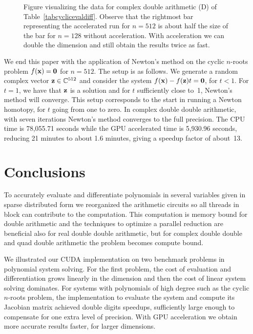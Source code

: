 \documentclass{article}
\newcommand\x{{\bf x}}
\newcommand\z{{\bf z}}
\newcommand\zero{{\bf 0}}
\newcommand\cc{{\mathbb C}}
\begin{document}
\begin{figure}[hbt]
\begin{center}
\caption{Figure visualizing the data 
for complex double arithmetic (D) of Table~\ref{tabcyclicevaldiff}.
Observe that the rightmost bar representing the accelerated run 
for $n=512$ is about half the size of the bar
for $n=128$ without acceleration.
With acceleration we can double the dimension and still obtain
the results twice as fast.}
\label{figcyclicevaldiff}
\end{center}
\end{figure}

We end this paper with the application of Newton's method
on the cyclic $n$-roots problem $f(\x) = \zero$ for $n=512$.
The setup is as follows.  We generate a random complex vector
$\z \in \cc^{512}$ and consider the system
$f(\x) - f(\z) t = \zero$, for $t < 1$.
For $t = 1$, we have that $\z$ is a solution
and for $t$ sufficiently close to~1, Newton's method will converge.
This setup corresponds to the start in running a Newton homotopy,
for $t$ going from one to zero.
In complex double double arithmetic, with seven iterations
Newton's method converges to the full precision.
The CPU time is 78,055.71 seconds
while the GPU accelerated time is 5,930.96 seconds,
reducing 21 minutes to about 1.6 minutes,
giving a speedup factor of about~13.

\section{Conclusions}

To accurately evaluate and differentiate polynomials in several variables
given in sparse distributed form we reorganized the arithmetic circuits
so all threads in block can contribute to the computation.
This computation is memory bound for double arithmetic and the
techniques to optimize a parallel reduction are beneficial also
for real double double arithmetic, but for complex double double
and quad double arithmetic the problem becomes compute bound.

We illustrated our CUDA implementation on two benchmark problems
in polynomial system solving.  For the first problem, the cost
of evaluation and differentiation grows linearly in the dimension
and then the cost of linear system solving dominates.
For systems with polynomials of high degree such as the
cyclic $n$-roots problem, the implementation to evaluate the
system and compute its Jacobian matrix achieved double digits speedups,
sufficiently large enough to compensate for one extra level of precision.
With GPU acceleration we obtain more accurate results faster,
for larger dimensions.
\end{document}
